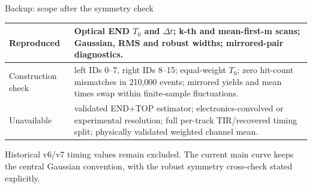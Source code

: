 \begin{frame}{Backup: scope after the symmetry check}
\small
\begin{tabularx}{\linewidth}{@{}lX@{}}
\toprule
Reproduced & Optical END $T_0$ and $\Delta t$; k-th and mean-first-m scans; Gaussian, RMS and robust widths; mirrored-pair diagnostics.\\
\midrule
Construction check & left IDs 0--7, right IDs 8--15; equal-weight $T_0$; zero hit-count mismatches in 210,000 events; mirrored yields and mean times swap within finite-sample fluctuations.\\
\midrule
Unavailable & validated END+TOP estimator; electronics-convolved or experimental resolution; full per-track TIR/recovered timing split; physically validated weighted channel mean.\\
\bottomrule
\end{tabularx}
\vspace{6pt}
Historical v6/v7 timing values remain excluded. The current main curve keeps the central Gaussian convention, with the robust symmetry cross-check stated explicitly.
\end{frame}
